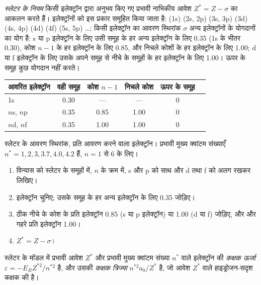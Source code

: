 \begin{definition}[स्लेटर के नियम]\label{def:b2:atomic-orbitals:slater}
\emph{स्लेटर के नियम} किसी इलेक्ट्रॉन द्वारा अनुभव किए गए प्रभावी नाभिकीय आवेश
$Z^* = Z - \sigma$ का आकलन करते हैं। इलेक्ट्रॉनों को इस प्रकार समूहित किया जाता है:
(1s) (2s, 2p) (3s, 3p) (3d) (4s, 4p) (4d) (4f) (5s, 5p) \dots; किसी इलेक्ट्रॉन का आवरण
स्थिरांक $\sigma$ अन्य इलेक्ट्रॉनों के योगदानों का योग है:
s या p इलेक्ट्रॉन के लिए उसी समूह के हर अन्य इलेक्ट्रॉन के लिए 0.35 (1s के भीतर 0.30), कोश $n - 1$ के हर इलेक्ट्रॉन के लिए 0.85, और
निचले कोशों के हर इलेक्ट्रॉन के लिए 1.00; d या f इलेक्ट्रॉन के लिए उसके अपने समूह से नीचे के
समूहों के हर इलेक्ट्रॉन के लिए 1.00। ऊपर के समूह कुछ योगदान नहीं करते।
\end{definition}

\begin{omfigure}
\small
\renewcommand{\arraystretch}{1.2}
\begin{tabular}{l|ccccc}
आवरित इलेक्ट्रॉन & वही समूह & कोश $n - 1$ & निचले कोश & ऊपर के समूह \\ \hline
1s & 0.30 & --- & --- & 0 \\
$n$s, $n$p & 0.35 & 0.85 & 1.00 & 0 \\
$n$d, $n$f & 0.35 & 1.00 & 1.00 & 0 \\
\end{tabular}

\smallskip
{\small स्लेटर के आवरण स्थिरांक, प्रति आवरण करने वाला इलेक्ट्रॉन। प्रभावी
मुख्य क्वांटम संख्याएँ $n^* = 1, 2, 3, 3.7, 4.0, 4.2$ हैं, $n = 1$ से 6 के लिए।}
\end{omfigure}

\begin{method}[प्रभावी आवेश का परिकलन]\label{met:b2:atomic-orbitals:slater}
\begin{enumerate}
  \item विन्यास को स्लेटर के समूहों में, $n$ के क्रम में, s और p को
        साथ और d तथा f को अलग रखकर लिखिए।
  \item इलेक्ट्रॉन चुनिए; उसके समूह के हर अन्य इलेक्ट्रॉन के लिए 0.35 जोड़िए।
  \item ठीक नीचे के कोश के प्रति इलेक्ट्रॉन 0.85 (s या p इलेक्ट्रॉन) या 1.00 (d या f) जोड़िए,
        और और गहरे प्रति इलेक्ट्रॉन 1.00।
  \item $Z^* = Z - \sigma$।
\end{enumerate}
\end{method}

\begin{definition}[कक्षक ऊर्जा और त्रिज्या]\label{def:b2:atomic-orbitals:orbital-energy}
स्लेटर के मॉडल में प्रभावी आवेश $Z^*$ और प्रभावी मुख्य क्वांटम संख्या $n^*$ वाले
इलेक्ट्रॉन की \emph{कक्षक ऊर्जा}
$\varepsilon = -E_RZ^{*2}/n^{*2}$ है, और उसकी \emph{कक्षक त्रिज्या}
$n^{*2}a_0/Z^*$ है, जो आवेश $Z^*$ वाले हाइड्रोजन-सदृश कक्षक की  है।
\end{definition}

